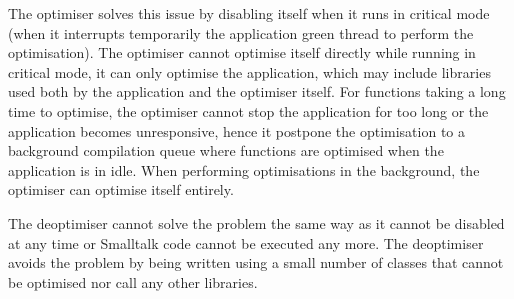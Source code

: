 \documentclass[a4paper,12pt,twoside]{../includes/ThesisStyle}
\begin{document}
The optimiser solves this issue by disabling itself when it runs in critical mode (when it interrupts temporarily the application green thread to perform the optimisation). The optimiser cannot optimise itself directly while running in critical mode, it can only optimise the  application, which may include libraries used both by the application and the optimiser itself. For functions taking a long time to optimise, the optimiser cannot stop the application for too long or the application becomes unresponsive, hence it postpone the optimisation to a background compilation queue where functions are optimised when the application is in idle. When performing optimisations in the background, the optimiser can optimise itself entirely.

The deoptimiser cannot solve the problem the same way as it cannot be disabled at any time or Smalltalk code cannot be executed any more. The deoptimiser avoids the problem by being written using a small number of classes that cannot be optimised nor call any other libraries.

\ifx\wholebook\relax\else
    
\end{document}

